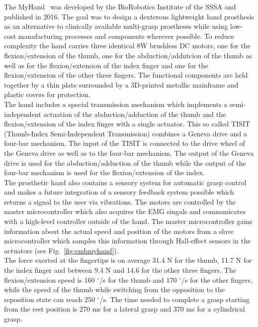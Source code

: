 \documentclass[a4paper, 10pt, conference]{ieeeconf}      %
\begin{document}
The MyHand~\cite{myhand} was developed by the BioRobotics Institute of the SSSA and published in 2016. The goal was to design a dexterous lightweight hand prosthesis as an alternative to clinically available multi-grasp prostheses while using low-cost manufacturing processes and components wherever possible. To reduce complexity the hand carries three identical 8W brushless DC motors, one for the flexion/extension of the thumb, one for the abduction/addutcion of the thumb as well as for the flexion/extension of the index finger and one for the flexion/extension of the other three fingers. The functional components are held together by a thin plate surrounded by a 3D-printed metallic mainframe and plastic covers for protection.\\
The hand includes a special transmission mechanism which implements a semi-independent actuation of the abduction/adduction of the thumb and the flexion/extension of the index finger with a single actuator. This so called TISIT (Thumb-Index Semi-Independent Transmission) combines a Geneva drive and a four-bar mechanism. The input of the TISIT is connected to the drive wheel of the Geneva drive as well as to the four-bar mechanism. The output of the Geneva drive is used for the abduction/adduction of the thumb while the output of the four-bar mechanism is used for the flexion/extension of the index.\\
The prosthetic hand also contains a sensory system for automatic grasp control and makes a future integration of a sensory feedback system possible which returns a signal to the user via vibrations. The motors are controlled by the master microcontroller which also acquires the EMG singals and communicates with a high-level controller outside of the hand. The master microcontroller gains information about the actual speed and position of the motors from a slave microcontroller which samples this information through Hall-effect sensors in the actuators (see Fig.~\ref{fig:embmyhand}).\\
The force exerted at the fingertips is on average 31.4 N for the thumb, 11.7 N for the index finger and between 9.4 N and 14.6 for the other three fingers. The flexion/extension speed is 160 $^\circ$/s for the thumb and 170 $^\circ$/s for the other fingers, while the speed of the thumb while switching from the opposition to the reposition state can reach 250 $^\circ$/s. The time needed to complete a grasp starting from the rest position is 270 ms for a lateral grasp and 370 ms for a cylindrical grasp.
\end{document}
